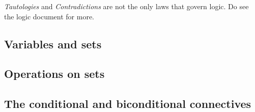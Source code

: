 \documentclass[../setup.tex]{subfiles}
\begin{document}
\begin{remark}
\textit{Tautologies} and \textit{Contradictions} are not the only laws that govern logic. Do see the logic document for more.
\end{remark}



\subsection{Variables and sets}




\subsection{Operations on sets}
\subsection{The conditional and biconditional connectives}
\end{document}
